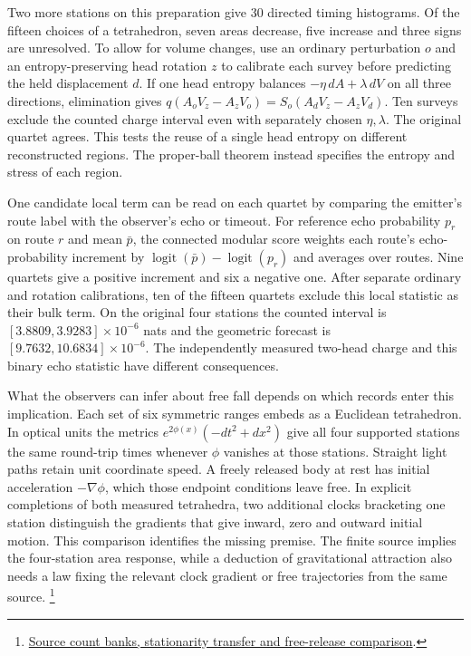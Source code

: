 \documentclass[11pt]{article}
\begin{document}
Two more stations on this preparation give 30 directed timing
histograms. Of the fifteen choices of a tetrahedron, seven areas
decrease, five increase and three signs are unresolved. To allow for
volume changes, use an ordinary perturbation $o$ and an
entropy-preserving head rotation $z$ to calibrate each survey before
predicting the held displacement $d$. If one head entropy balances
$-\eta\,dA+\lambda\,dV$ on all three directions, elimination gives
$q(A_oV_z-A_zV_o)=S_o(A_dV_z-A_zV_d)$. Ten surveys exclude the
counted charge interval even with separately chosen $\eta,\lambda$.
The original quartet agrees. This tests the reuse of a single head
entropy on different reconstructed regions. The proper-ball theorem
instead specifies the entropy and stress of each region.

One candidate local term can be read on each quartet by comparing
the emitter's route label with the observer's echo or timeout. For
reference echo probability $p_r$ on route $r$ and mean $\bar p$,
the connected modular score weights each route's echo-probability
increment by $\operatorname{logit}(\bar p)-\operatorname{logit}(p_r)$
and averages over routes. Nine quartets give a positive increment and
six a negative one. After separate ordinary and rotation calibrations,
ten of the fifteen quartets exclude this local statistic as their bulk
term. On the original four stations the counted interval is
$[3.8809,3.9283]\times10^{-6}$ nats and the geometric forecast is
$[9.7632,10.6834]\times10^{-6}$. The independently measured two-head
charge and this binary echo statistic have different consequences.

What the observers can infer about free fall depends on which records
enter this implication. Each set of six symmetric ranges embeds as a
Euclidean tetrahedron. In optical units the metrics
$e^{2\phi(x)}(-dt^2+dx^2)$ give all four supported stations the same
round-trip times whenever $\phi$ vanishes at those stations. Straight
light paths retain unit coordinate speed. A freely released body at
rest has initial acceleration $-\nabla\phi$, which those endpoint
conditions leave free. In explicit completions of both measured
tetrahedra, two additional clocks bracketing one station distinguish
the gradients that give inward, zero and outward initial motion.
This comparison identifies the missing premise. The finite source
implies the four-station area response, while a deduction of
gravitational attraction also needs a law fixing the relevant clock
gradient or free trajectories from the same source.%
\footnote{\href{https://github.com/FloatingPragma/observer-patch-holography/tree/main/openwave/interval_echo/row_19/selected_collar}{Source count banks, stationarity transfer and free-release comparison}.}
\end{document}
